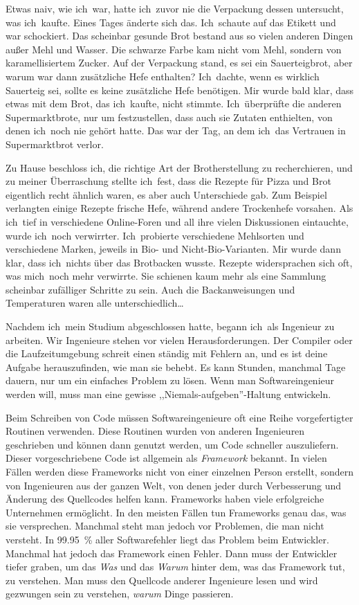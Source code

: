 Etwas naiv, wie ich~war, hatte ich~zuvor nie die Verpackung dessen untersucht,
was ich~kaufte. Eines Tages änderte sich das. Ich~schaute auf das Etikett und
war schockiert. Das scheinbar gesunde Brot bestand aus so vielen anderen Dingen
außer Mehl und Wasser. Die schwarze Farbe kam nicht vom Mehl, sondern von
karamellisiertem Zucker. Auf der Verpackung stand, es sei ein Sauerteigbrot,
aber warum war dann zusätzliche Hefe enthalten? Ich~dachte, wenn es wirklich
Sauerteig sei, sollte es keine zusätzliche Hefe benötigen. Mir wurde bald
klar, dass etwas mit dem Brot, das ich~kaufte, nicht stimmte. Ich~überprüfte
die anderen Supermarktbrote, nur um festzustellen, dass auch sie Zutaten
enthielten, von denen ich~noch nie gehört hatte. Das war der Tag, an dem
ich~das Vertrauen in Supermarktbrot verlor.

Zu Hause beschloss ich, die richtige Art der Brotherstellung zu recherchieren,
und zu meiner Überraschung stellte ich~fest, dass die Rezepte für Pizza und
Brot eigentlich recht ähnlich waren, es aber auch Unterschiede gab. Zum
Beispiel verlangten einige Rezepte frische Hefe, während andere Trockenhefe
vorsahen. Als ich~tief in verschiedene Online-Foren und all ihre vielen
Diskussionen eintauchte, wurde ich~noch verwirrter. Ich~probierte
verschiedene Mehlsorten und verschiedene Marken, jeweils in Bio- und
Nicht-Bio-Varianten. Mir wurde dann klar, dass ich~nichts über das Brotbacken
wusste. Rezepte widersprachen sich oft, was mich~noch mehr verwirrte. Sie
schienen kaum mehr als eine Sammlung scheinbar zufälliger Schritte zu sein.
Auch die Backanweisungen und Temperaturen waren alle unterschiedlich\dots

Nachdem ich~mein Studium abgeschlossen hatte, begann ich~als Ingenieur zu
arbeiten. Wir Ingenieure stehen vor vielen Herausforderungen. Der Compiler
oder die Laufzeitumgebung schreit einen ständig mit Fehlern an, und es ist
deine Aufgabe herauszufinden, wie man sie behebt. Es kann Stunden, manchmal
Tage dauern, nur um ein einfaches Problem zu lösen. Wenn man
Softwareingenieur werden will, muss man eine gewisse ,,Niemals-aufgeben''-Haltung
entwickeln.

Beim Schreiben von Code müssen Softwareingenieure oft eine Reihe
vorgefertigter Routinen verwenden. Diese Routinen wurden von anderen
Ingenieuren geschrieben und können dann genutzt werden, um Code schneller
auszuliefern. Dieser vorgeschriebene Code ist allgemein als \emph{Framework}
bekannt. In vielen Fällen werden diese Frameworks nicht von einer einzelnen
Person erstellt, sondern von Ingenieuren aus der ganzen Welt, von denen jeder
durch Verbesserung und Änderung des Quellcodes helfen kann. Frameworks haben
viele erfolgreiche Unternehmen ermöglicht. In den meisten Fällen tun
Frameworks genau das, was sie versprechen. Manchmal steht man jedoch vor
Problemen, die man nicht versteht. In \qty{99,95}{\percent} aller
Softwarefehler liegt das Problem beim Entwickler. Manchmal hat jedoch das
Framework einen Fehler. Dann muss der Entwickler tiefer graben, um das
\emph{Was} und das \emph{Warum} hinter dem, was das Framework tut, zu
verstehen. Man muss den Quellcode anderer Ingenieure lesen und wird gezwungen
sein zu verstehen, \emph{warum} Dinge passieren.

